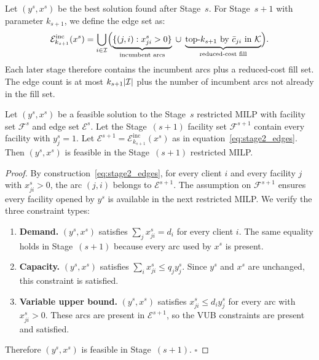 Let $(y^s, x^s)$ be the best solution found after Stage~$s$.
For Stage~$s{+}1$ with parameter $k_{s+1}$, we define the edge set as:
\begin{equation}
  \mathcal{E}^{\text{inc}}_{k_{s+1}}(x^s)
  = \bigcup_{i \in \mathcal{I}}
    \Bigl(
      \underbrace{\{(j, i) : x^s_{ji} > 0\}}_{\text{incumbent arcs}}
      \;\cup\;
      \underbrace{\text{top-}k_{s+1}\text{ by } \bar{c}_{ji}
      \text{ in } \mathcal{K}}_{\text{reduced-cost fill}}
    \Bigr).
  \label{eq:stage2_edges}
\end{equation}
Each later stage therefore contains the incumbent arcs plus a reduced-cost
fill set.
The edge count is at most $k_{s+1}|\mathcal{I}|$ plus the number of incumbent arcs
not already in the fill set.

\begin{proposition}
\label{prop:feasibility}
Let $(y^s, x^s)$ be a feasible solution to the Stage~$s$ restricted MILP
with facility set $\mathcal{F}^s$ and edge set $\mathcal{E}^s$.
Let the Stage~$(s{+}1)$ facility set $\mathcal{F}^{s+1}$ contain every
facility with $y^s_j=1$.
Let $\mathcal{E}^{s+1} = \mathcal{E}^{\mathrm{inc}}_{k_{s+1}}(x^s)$ as in
equation~\eqref{eq:stage2_edges}.
Then $(y^s, x^s)$ is feasible in the Stage~$(s{+}1)$ restricted MILP.
\end{proposition}

\begin{proof}
By construction~\eqref{eq:stage2_edges}, for every client $i$ and every
facility $j$ with $x^s_{ji} > 0$, the arc $(j,i)$ belongs to
$\mathcal{E}^{s+1}$.
The assumption on $\mathcal{F}^{s+1}$ ensures every facility opened by
$y^s$ is available in the next restricted MILP.
We verify the three constraint types:
\begin{enumerate}
  \item \textbf{Demand.} $(y^s, x^s)$ satisfies $\sum_j x^s_{ji} = d_i$
    for every client $i$. The same equality holds in Stage~$(s{+}1)$
    because every arc used by $x^s$ is present.
  \item \textbf{Capacity.} $(y^s, x^s)$ satisfies
    $\sum_i x^s_{ji} \leq q_j y^s_j$. Since $y^s$ and $x^s$ are unchanged,
    this constraint is satisfied.
  \item \textbf{Variable upper bound.} $(y^s, x^s)$ satisfies
    $x^s_{ji} \leq d_i y^s_j$ for every arc with $x^s_{ji} > 0$.
    These arcs are present in $\mathcal{E}^{s+1}$, so the VUB constraints
    are present and satisfied.
\end{enumerate}
Therefore $(y^s, x^s)$ is feasible in Stage~$(s{+}1)$. \hfill$\square$
\end{proof}

